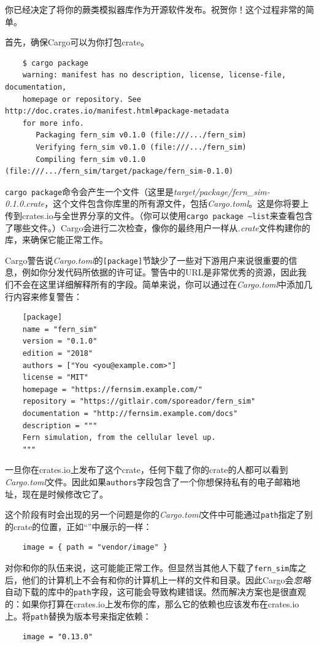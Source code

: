 你已经决定了将你的蕨类模拟器库作为开源软件发布。祝贺你！这个过程非常的简单。

首先，确保Cargo可以为你打包crate。

\begin{verbatim}
    $ cargo package
    warning: manifest has no description, license, license-file, documentation,
    homepage or repository. See http://doc.crates.io/manifest.html#package-metadata
    for more info.
       Packaging fern_sim v0.1.0 (file:///.../fern_sim)
       Verifying fern_sim v0.1.0 (file:///.../fern_sim)
       Compiling fern_sim v0.1.0 (file:///.../fern_sim/target/package/fern_sim-0.1.0)
\end{verbatim}

\texttt{cargo package}命令会产生一个文件（这里是\emph{target/package/fern\_sim-0.1.0.crate}，这个文件包含你库里的所有源文件，包括\emph{Cargo.toml}。这是你将要上传到crates.io与全世界分享的文件。（你可以使用\texttt{cargo package --list}来查看包含了哪些文件。）Cargo会进行二次检查，像你的最终用户一样从\emph{.crate}文件构建你的库，来确保它能正常工作。

Cargo警告说\emph{Cargo.toml}的\texttt{[package]}节缺少了一些对下游用户来说很重要的信息，例如你分发代码所依据的许可证。警告中的URL是非常优秀的资源，因此我们不会在这里详细解释所有的字段。简单来说，你可以通过在\emph{Cargo.toml}中添加几行内容来修复警告：
\begin{verbatim}
    [package]
    name = "fern_sim"
    version = "0.1.0"
    edition = "2018"
    authors = ["You <you@example.com>"]
    license = "MIT"
    homepage = "https://fernsim.example.com/"
    repository = "https://gitlair.com/sporeador/fern_sim"
    documentation = "http://fernsim.example.com/docs"
    description = """
    Fern simulation, from the cellular level up.
    """
\end{verbatim}

\begin{note}
    一旦你在crates.io上发布了这个crate，任何下载了你的crate的人都可以看到\emph{Cargo.toml}文件。因此如果\texttt{authors}字段包含了一个你想保持私有的电子邮箱地址，现在是时候修改它了。
\end{note}

这个阶段有时会出现的另一个问题是你的\emph{Cargo.toml}文件中可能通过\texttt{path}指定了别的crate的位置，正如“”中展示的一样：
\begin{verbatim}
    image = { path = "vendor/image" }
\end{verbatim}

对你和你的队伍来说，这可能能正常工作。但显然当其他人下载了\texttt{fern\_sim}库之后，他们的计算机上不会有和你的计算机上一样的文件和目录。因此Cargo会\emph{忽略}自动下载的库中的\texttt{path}字段，这可能会导致构建错误。然而解决方案也是很直观的：如果你打算在crates.io上发布你的库，那么它的依赖也应该发布在crates.io上。将\texttt{path}替换为版本号来指定依赖：
\begin{verbatim}
    image = "0.13.0"
\end{verbatim}

